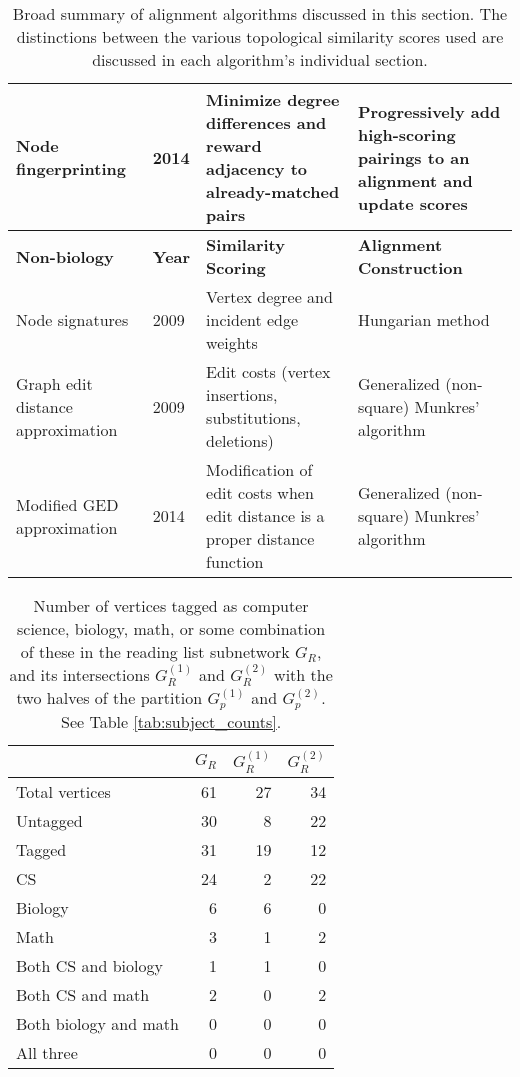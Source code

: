\documentclass[12pt]{thesis}
\theoremstyle{plain}
\theoremstyle{definition}
\theoremstyle{remark}
\begin{document}
\begin{table}[!hp]
{\begin{tabular}{|L{0.2\textwidth}|L{0.055\textwidth}|L{0.33\textwidth}|L{0.31\textwidth}|}
Node fingerprinting \cite{radu2014node} & 2014 & Minimize degree differences and reward adjacency to already-matched pairs & Progressively add high-scoring pairings to an alignment and update scores\\ \hline \hline

\textbf{Non-biology}  & \textbf{Year} & \textbf{Similarity Scoring} & \textbf{Alignment Construction} \\ \hline\hline

Node signatures \cite{Jouili_2009} & 2009 & Vertex degree and incident edge weights & Hungarian method \\ \hline

Graph edit distance approximation \cite{Riesen_2009} & 2009 & Edit costs (vertex insertions, substitutions, deletions) & Generalized (non-square) Munkres' algorithm \\ \hline
Modified GED approximation \cite{Serratosa_2014} & 2014 & Modification of edit costs when edit distance is a proper distance function & Generalized (non-square) Munkres' algorithm \\ \hline 
\end{tabular}
}
\caption{Broad summary of alignment algorithms discussed in this section. The distinctions between the various topological similarity scores used are discussed in each algorithm's individual section.}
\label{tab:alignment_algorithms}
\end{table}



\begin{table}[t]
\centering
\begin{tabular}{|l|r|r|r|}
\hline & $G_R$ & $G_R^{(1)}$ & $G_R^{(2)}$ \\ \hline
Total vertices & 61 & 27 & 34 \\ \hline
Untagged & 30 & 8 & 22 \\ \hline
Tagged & 31 & 19 & 12 \\ \hline
CS & 24 & 2 & 22 \\ \hline
Biology & 6 & 6 & 0 \\ \hline
Math & 3 & 1 & 2 \\ \hline
Both CS and biology & 1 & 1 & 0 \\ \hline
Both CS and math & 2 & 0 & 2 \\ \hline
Both biology and math & 0 & 0 & 0 \\ \hline
All three & 0 & 0 & 0 \\ \hline
\end{tabular}
\caption{Number of vertices tagged as computer science, biology, math, or some combination of these in the reading list subnetwork $G_R$, and its intersections $G_R^{(1)}$ and $G_R^{(2)}$ with the two halves of the partition $G_p^{(1)}$ and $G_p^{(2)}$. See Table \ref{tab:subject_counts}.}
\label{tab:reading_list_subject_counts}
\end{table}
\end{document}

